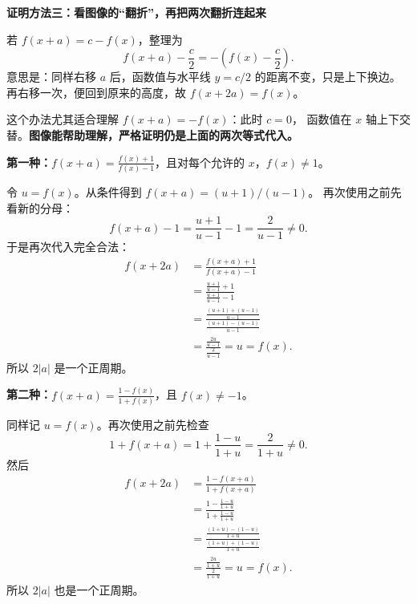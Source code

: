 \begin{proofbox}
\medskip
\end{proofbox}\clearpage\begin{proofbox}\textbf{证明方法三：看图像的“翻折”，再把两次翻折连起来}



若 $f(x+a)=c-f(x)$，整理为
\[
 f(x+a)-\frac c2=-\left(f(x)-\frac c2\right).
\]
意思是：同样右移 $a$ 后，函数值与水平线 $y=c/2$ 的距离不变，只是上下换边。
再右移一次，便回到原来的高度，故 $f(x+2a)=f(x)$。

这个办法尤其适合理解 $f(x+a)=-f(x)$：此时 $c=0$，
函数值在 $x$ 轴上下交替。\textbf{图像能帮助理解，严格证明仍是上面的两次等式代入。}





\end{proofbox}\clearpage\begin{proofbox}\textbf{第一种：}$\displaystyle f(x+a)=\frac{f(x)+1}{f(x)-1}$，且对每个允许的 $x$，$f(x)\ne1$。


令 $u=f(x)$。从条件得到 $f(x+a)=(u+1)/(u-1)$。
再次使用之前先看新的分母：
\[
 f(x+a)-1=\frac{u+1}{u-1}-1=\frac{2}{u-1}\ne0.
\]
于是再次代入完全合法：
\[
\begin{aligned}
 f(x+2a)
 &=\frac{f(x+a)+1}{f(x+a)-1}\\[4pt]
 &=\frac{\frac{u+1}{u-1}+1}{\frac{u+1}{u-1}-1}\\[6pt]
 &=\frac{\frac{(u+1)+(u-1)}{u-1}}{\frac{(u+1)-(u-1)}{u-1}}\\[6pt]
 &=\frac{\frac{2u}{u-1}}{\frac2{u-1}}
 =u=f(x).
\end{aligned}
\]
所以 $2|a|$ 是一个正周期。


\end{proofbox}\clearpage\begin{proofbox}\textbf{第二种：}$\displaystyle f(x+a)=\frac{1-f(x)}{1+f(x)}$，且 $f(x)\ne-1$。


同样记 $u=f(x)$。再次使用之前先检查
\[
 1+f(x+a)=1+\frac{1-u}{1+u}=\frac2{1+u}\ne0.
\]
然后
\[
\begin{aligned}
 f(x+2a)
 &=\frac{1-f(x+a)}{1+f(x+a)}\\[4pt]
 &=\frac{1-\frac{1-u}{1+u}}{1+\frac{1-u}{1+u}}\\[6pt]
 &=\frac{\frac{(1+u)-(1-u)}{1+u}}{\frac{(1+u)+(1-u)}{1+u}}\\[6pt]
 &=\frac{\frac{2u}{1+u}}{\frac2{1+u}}
 =u=f(x).
\end{aligned}
\]
所以 $2|a|$ 也是一个正周期。


\end{proofbox}
